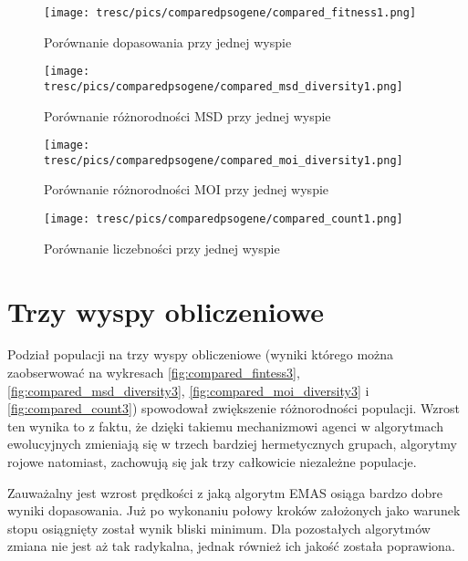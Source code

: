 \clearpage

\begin{figure}[H]
\begin{center} 
\texttt{[image: tresc/pics/comparedpsogene/compared\_fitness1.png]}
\caption{Porównanie dopasowania przy jednej wyspie}
\label{fig:compared_fintess1}
\end{center}
\end{figure}

\begin{figure}[H]
\begin{center} 
\texttt{[image: tresc/pics/comparedpsogene/compared\_msd\_diversity1.png]}
\caption{Porównanie różnorodności MSD przy jednej wyspie}
\label{fig:compared_msd_diversity1}
\end{center}
\end{figure}

\begin{figure}[H]
\begin{center} 
\texttt{[image: tresc/pics/comparedpsogene/compared\_moi\_diversity1.png]}
\caption{Porównanie różnorodności MOI przy jednej wyspie}
\label{fig:compared_moi_diversity1}
\end{center}
\end{figure}

\begin{figure}[H]
\begin{center} 
\texttt{[image: tresc/pics/comparedpsogene/compared\_count1.png]}
\caption{Porównanie liczebności przy jednej wyspie}
\label{fig:compared_count1}
\end{center}
\end{figure}


\section{Trzy wyspy obliczeniowe}

Podział populacji na trzy wyspy obliczeniowe (wyniki którego można zaobserwować na wykresach \ref{fig:compared_fintess3}, \ref{fig:compared_msd_diversity3}, \ref{fig:compared_moi_diversity3} i \ref{fig:compared_count3}) spowodował zwiększenie różnorodności populacji. Wzrost ten wynika to z faktu, że dzięki takiemu mechanizmowi agenci w algorytmach ewolucyjnych zmieniają się w trzech bardziej hermetycznych grupach, algorytmy rojowe natomiast, zachowują się jak trzy całkowicie niezależne populacje.

Zauważalny jest wzrost prędkości z jaką algorytm EMAS osiąga bardzo dobre wyniki dopasowania. Już po wykonaniu połowy kroków założonych jako warunek stopu osiągnięty został wynik bliski minimum. Dla pozostałych algorytmów zmiana nie jest aż tak radykalna, jednak również ich jakość została poprawiona. 


